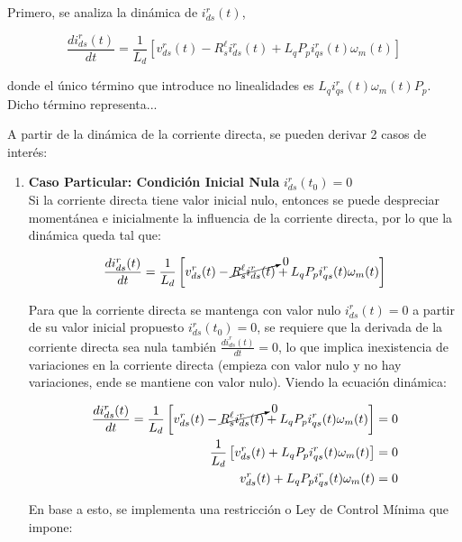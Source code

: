 \documentclass[blue,fullpaper]{ludusofficial}  %
\begin{document}
Primero, se analiza la dinámica de $i_{ds}^{r}(t)$,

\begin{equation*}
    \frac{di_{ds}^{r}(t)}{dt} = \frac{1}{L_{d}} \left[ v_{ds}^{r}(t) - R_{s}^{\ell} i_{ds}^{r}(t) + L_{q}P_{p} i_{qs}^{r}(t) \omega_{m}(t) \right]
\end{equation*}

donde el único término que introduce no linealidades es $ L_{q}i_{qs}^{r}(t) \omega_{m}(t)P_{p}$. Dicho término representa... 

A partir de la dinámica de la corriente directa, se pueden derivar 2 casos de interés:

\begin{enumerate}
    \item \textbf{Caso Particular: Condición Inicial Nula} $i_{ds}^{r}(t_0) = 0$ \\
    Si la corriente directa tiene valor inicial nulo, entonces se puede despreciar momentánea e inicialmente la influencia de la corriente directa, por lo que la dinámica queda tal que:

    \begin{equation*}
        \frac{di_{ds}^{r}(t)}{dt} = \frac{1}{L_{d}} \left[ v_{ds}^{r}(t) - \cancelto{0}{R_{s}^{\ell} i_{ds}^{r}(t)} + L_{q}P_{p} i_{qs}^{r}(t) \omega_{m}(t) \right]
    \end{equation*}

    Para que la corriente directa se mantenga con valor nulo $i_{ds}^{r}(t) = 0$ a partir de su valor inicial propuesto $i_{ds}^{r}(t_0) = 0$, se requiere que la derivada de la corriente directa sea nula también $\frac{di_{ds}^{r}(t)}{dt} = 0$, lo que implica inexistencia de variaciones en la corriente directa (empieza con valor nulo y no hay variaciones, ende se mantiene con valor nulo). Viendo la ecuación dinámica:

    \begin{align*}
        \frac{di_{ds}^{r}(t)}{dt} = \frac{1}{L_{d}} \left[ v_{ds}^{r}(t) - \cancelto{0}{R_{s}^{\ell} i_{ds}^{r}(t)} + L_{q}P_{p} i_{qs}^{r}(t) \omega_{m}(t) \right] & = 0 \\
        \frac{1}{L_{d}} \left[ v_{ds}^{r}(t) + L_{q}P_{p} i_{qs}^{r}(t) \omega_{m}(t) \right] & = 0 \\
         v_{ds}^{r}(t) + L_{q}P_{p} i_{qs}^{r}(t) \omega_{m}(t) & = 0
    \end{align*}

    En base a esto, se implementa una restricción o Ley de Control Mínima que impone:
    

\end{enumerate}
\end{document}

